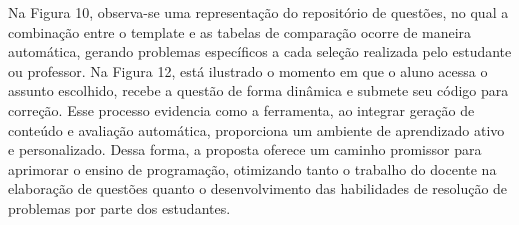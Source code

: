 Na Figura 10, observa-se uma representação do repositório de questões, no qual a combinação entre o template e as tabelas de comparação ocorre de maneira automática, gerando problemas específicos a cada seleção realizada pelo estudante ou professor. Na Figura 12, está ilustrado o momento em que o aluno acessa o assunto escolhido, recebe a questão de forma dinâmica e submete seu código para correção. Esse processo evidencia como a ferramenta, ao integrar geração de conteúdo e avaliação automática, proporciona um ambiente de aprendizado ativo e personalizado. Dessa forma, a proposta oferece um caminho promissor para aprimorar o ensino de programação, otimizando tanto o trabalho do docente na elaboração de questões quanto o desenvolvimento das habilidades de resolução de problemas por parte dos estudantes.

 
